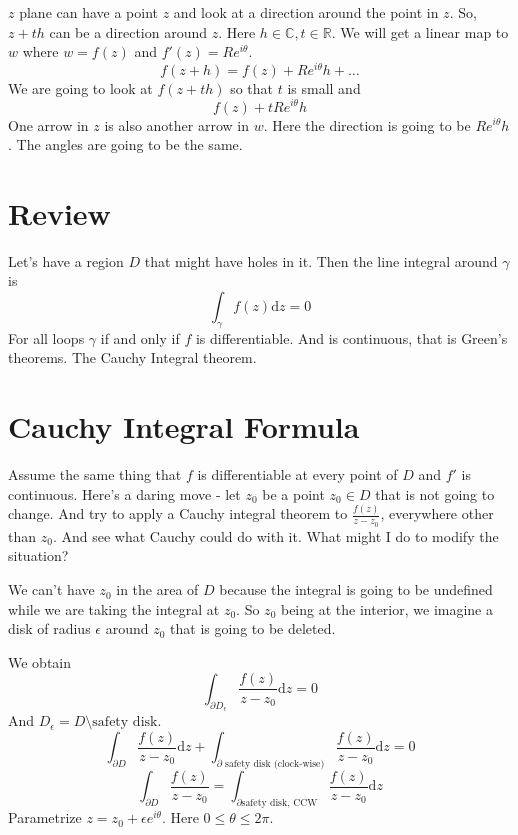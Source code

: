 \documentclass[letter]{article}
\title{}
\author{Ahmed Saad Sabit, Rice University}
\date{\today}
\begin{document}
$z$ plane can have a point $z$ and look at a direction around the point in $z$. So, $z + th$ can be a direction around $z$. Here $h \in \mathbb{C}, t \in \mathbb{R}$. We will get a linear map to $w$ where $w = f(z)$ and $f'(z) = Re^{i\theta}$.
\[
f(z+h) = f(z) + R e^{i\theta}h + \ldots
\]
We are going to look at $f(z+th)$ so that $t$ is small and 
\[
f(z) + t R e^{i\theta} h
\]
One arrow in $z$ is also another arrow in $w$. Here the direction is going to be $R e^{i\theta}h$. The angles are going to be the same. 

\section{Review}
Let's have a region $D$ that might have holes in it. Then the line integral around $\gamma$ is 
\[
\int_\gamma f(z) \mathrm{d} z = 0
\] For all loops $\gamma$ if and only if $f$ is differentiable. And is continuous, that is Green's theorems. The  Cauchy Integral theorem.

\section{Cauchy Integral Formula} 
Assume the same thing that $f$ is differentiable at every point of $D$ and $f'$ is continuous. Here's a daring move - let $z_0$ be a point $z_0 \in D$ that is not going to change. And try to apply a Cauchy integral theorem to $\frac{f(z)}{z-z_0}$, everywhere other than $z_0$. And see what Cauchy could do with it. What might I do to modify the situation? 

We can't have $z_0$ in the area of $D$ because the integral is going to be undefined while we are taking the integral at $z_0$. So $z_0$ being at the interior, we imagine a disk of radius $\epsilon$ around $z_0$ that is going to be deleted.

We obtain 
\[
	\int_{\partial D_\epsilon} \frac{f(z)}{z-z_0}\mathrm{d} z = 0
\]
And $D_{\epsilon} = D \setminus \text{safety disk}$. 
\[
	\int_{\partial D} \frac{f(z)}{z-z_0} \mathrm{d} z + 
	\int_{\partial \text{ safety disk (clock-wise)}} \frac{f(z)}{z-z_0} \mathrm{d} z = 0
\] 
\[
	\int_{\partial D} \frac{f(z)}{z-z_0} = \int_{\partial \text{safety disk, CCW}} \frac{f(z)}{z-z_0} \mathrm{d} z
\] 
Parametrize $z = z_0 + \epsilon e^{i \theta}$. Here $0 \le \theta \le 2\pi $. 
\end{document}
